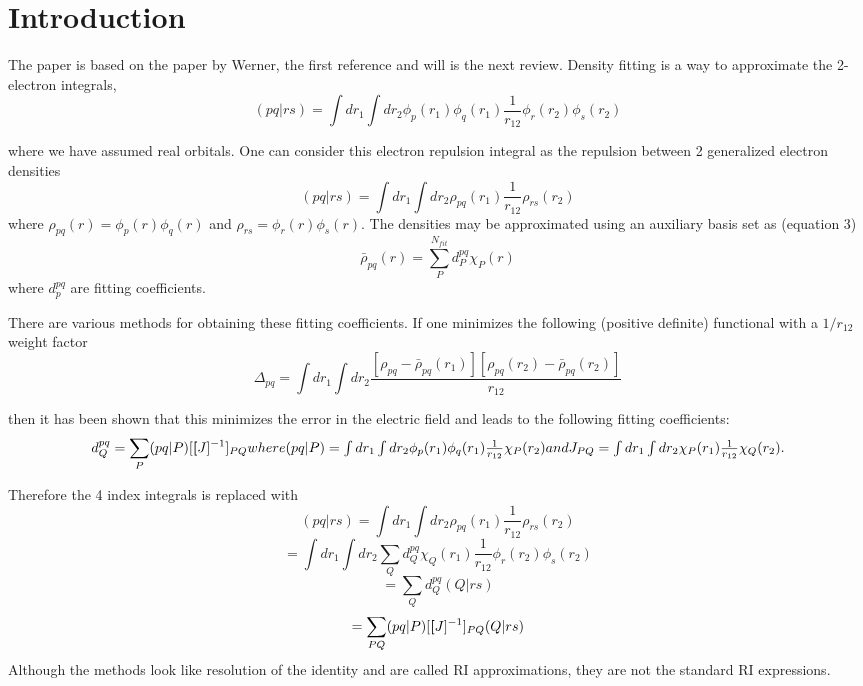 \documentclass[10pt, draft]{article}
\begin{document}
   \section{Introduction}
   The paper is based on the paper by Werner, the first reference and will is the next review. \linebreak[1]
   Density fitting is a way to approximate the 2-electron integrals,
   \[(pq|rs) = \int dr_1 \int dr_2 \phi_p(r_1)\phi_q(r_1) \frac{1}{r_{12}}\phi_r(r_2)\phi_s(r_2)\]
   
   where we have assumed real orbitals. One can consider this electron repulsion integral as the repulsion between 2 generalized electron densities
   \[(pq|rs) = \int dr_1\int dr_2 \rho_{pq}(r_1) \frac{1}{r_{12}}\rho_{rs}(r_2) \]
   where $\rho_{pq}(r) = \phi_p(r)\phi_q(r)$ and $\rho_{rs} = \phi_r(r)\phi_s(r).$ The densities may be approximated using an auxiliary basis set as (equation 3)
   \[\bar{\rho}_{pq}(r) = \sum_P^{N_{fit}} d^{pq}_P\chi_P(r)\]
   where $d_p^{pq}$ are fitting coefficients.  \linebreak[1]
   
   There are various methods for obtaining these fitting coefficients.  If one minimizes the following (positive definite) functional with a $1/r_{12}$ weight factor 
   \[ \Delta_{pq} = \int dr_1 \int dr_2 \frac{[\rho_{pq} - \bar{\rho}_{pq}(r_1)][\rho_{pq}(r_2) - \bar{\rho}_{pq}(r_2)]}{r_{12}} \]
   
   then it has been shown that this minimizes the error in the electric field and leads to the following fitting coefficients:
   \[d_Q^{pq} = \sum_P (pq|P)[\textbf[J]^{-1}]_{PQ}$$ where $$(pq|P) = \int dr_1 \int dr_2 \phi_p(r_1)\phi_q(r_1)\frac{1}{r_{12}}\chi_P(r_2)$$ and $$J_{PQ} = \int dr_1 \int dr_2 \chi_P(r_1)\frac{1}{r_{12}}\chi_Q(r_2).\]
   
   Therefore the 4 index integrals is replaced with 
   \[(pq|rs) = \int dr_1 \int dr_2 \rho_{pq}(r_1) \frac{1}{r_{12}}\rho_{rs}(r_2) \]
   \[ = \int dr_1 \int dr_2 \sum_Q d_Q^{pq}\chi_Q(r_1)\frac{1}{r_{12}}\phi_r(r_2)\phi_s(r_2) \]
   \[= \sum_Qd_Q^{pq}(Q|rs)\]
   \[=\sum_{PQ}(pq|P)[\textbf[J]^{-1}]_{PQ}(Q|rs) \]
	Although the methods look like resolution of the identity and are called RI approximations, they are not the standard RI expressions. \linebreak[1]
	
\end{document}
